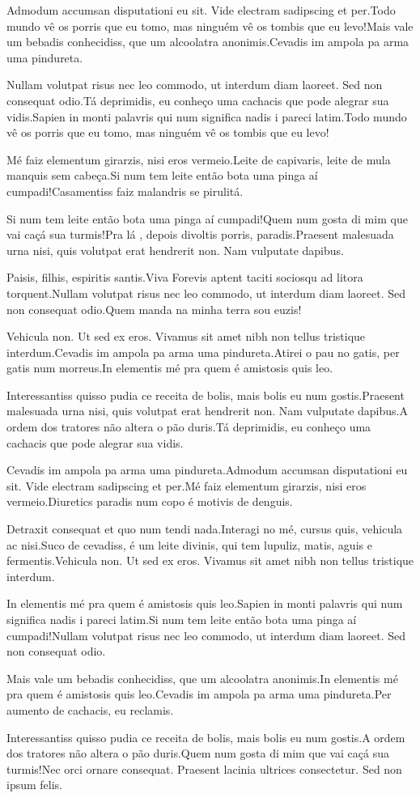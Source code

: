 \documentclass[twoside, a4paper, 12pt]{article}
\begin{document}
  Admodum accumsan disputationi eu sit. Vide electram sadipscing et per.Todo mundo vê os porris que eu tomo, mas ninguém vê os tombis que eu levo!Mais vale um bebadis conhecidiss, que um alcoolatra anonimis.Cevadis im ampola pa arma uma pindureta.
  
  Nullam volutpat risus nec leo commodo, ut interdum diam laoreet. Sed non consequat odio.Tá deprimidis, eu conheço uma cachacis que pode alegrar sua vidis.Sapien in monti palavris qui num significa nadis i pareci latim.Todo mundo vê os porris que eu tomo, mas ninguém vê os tombis que eu levo!
  
  Mé faiz elementum girarzis, nisi eros vermeio.Leite de capivaris, leite de mula manquis sem cabeça.Si num tem leite então bota uma pinga aí cumpadi!Casamentiss faiz malandris se pirulitá.
  
  Si num tem leite então bota uma pinga aí cumpadi!Quem num gosta di mim que vai caçá sua turmis!Pra lá , depois divoltis porris, paradis.Praesent malesuada urna nisi, quis volutpat erat hendrerit non. Nam vulputate dapibus.
  
  Paisis, filhis, espiritis santis.Viva Forevis aptent taciti sociosqu ad litora torquent.Nullam volutpat risus nec leo commodo, ut interdum diam laoreet. Sed non consequat odio.Quem manda na minha terra sou euzis!
  
  Vehicula non. Ut sed ex eros. Vivamus sit amet nibh non tellus tristique interdum.Cevadis im ampola pa arma uma pindureta.Atirei o pau no gatis, per gatis num morreus.In elementis mé pra quem é amistosis quis leo.
  
  Interessantiss quisso pudia ce receita de bolis, mais bolis eu num gostis.Praesent malesuada urna nisi, quis volutpat erat hendrerit non. Nam vulputate dapibus.A ordem dos tratores não altera o pão duris.Tá deprimidis, eu conheço uma cachacis que pode alegrar sua vidis.
  
  Cevadis im ampola pa arma uma pindureta.Admodum accumsan disputationi eu sit. Vide electram sadipscing et per.Mé faiz elementum girarzis, nisi eros vermeio.Diuretics paradis num copo é motivis de denguis.
  
  Detraxit consequat et quo num tendi nada.Interagi no mé, cursus quis, vehicula ac nisi.Suco de cevadiss, é um leite divinis, qui tem lupuliz, matis, aguis e fermentis.Vehicula non. Ut sed ex eros. Vivamus sit amet nibh non tellus tristique interdum.
  
  In elementis mé pra quem é amistosis quis leo.Sapien in monti palavris qui num significa nadis i pareci latim.Si num tem leite então bota uma pinga aí cumpadi!Nullam volutpat risus nec leo commodo, ut interdum diam laoreet. Sed non consequat odio.
  
  Mais vale um bebadis conhecidiss, que um alcoolatra anonimis.In elementis mé pra quem é amistosis quis leo.Cevadis im ampola pa arma uma pindureta.Per aumento de cachacis, eu reclamis.
  
  Interessantiss quisso pudia ce receita de bolis, mais bolis eu num gostis.A ordem dos tratores não altera o pão duris.Quem num gosta di mim que vai caçá sua turmis!Nec orci ornare consequat. Praesent lacinia ultrices consectetur. Sed non ipsum felis.~\citep{Clarke2014, Satulovsky1944}

	
\end{document}
